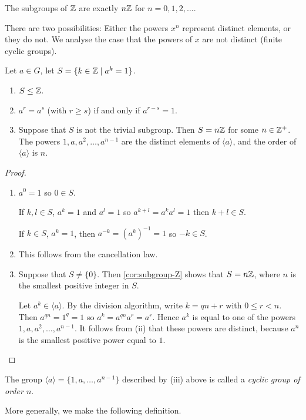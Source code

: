 \begin{corollary}\label{cor:subgroup-Z}
The subgroups of $\mathbb Z$ are exactly $n\mathbb Z$ for $n=0,1,2,\dots$.
\end{corollary}

There are two possibilities: Either the powers $x^n$ represent distinct elements, or they do not. We analyse the case that the powers of $x$ are not distinct (finite cyclic groups).

\begin{proposition}\label{prop:cyclic-group-order}
Let $a\in G$, let $S=\{k\in\mathbb Z\mid a^k=1\}$.
\begin{enumerate}[label=(\roman*)]
\item $S\le\mathbb Z$.
\item $a^r=a^s$ (with $r\ge s$) if and only if $a^{r-s}=1$.
\item Suppose that $S$ is not the trivial subgroup. Then $S=n\mathbb Z$ for some $n\in\mathbb Z^+$. The powers $1,a,a^2,\dots,a^{n-1}$ are the distinct elements of $\langle a\rangle$, and the order of $\langle a\rangle$ is $n$.
\end{enumerate}
\end{proposition}

\begin{proof} \
\begin{enumerate}[label=(\roman*)]
\item $a^0=1$ so $0\in S$.

If $k,l\in S$, $a^k=1$ and $a^l=1$ so $a^{k+l}=a^ka^l=1$ then $k+l\in S$. 

If $k\in S$, $a^k=1$, then $a^{-k}=(a^k)^{-1}=1$ so $-k\in S$.
\item This follows from the cancellation law.
\item Suppose that $S\neq\{0\}$. Then \cref{cor:subgroup-Z} shows that $S=n\mathbb Z$, where $n$ is the smallest positive integer in $S$.

Let $a^k\in\langle a\rangle$. By the division algorithm, write $k=qn+r$ with $0\le r<n$. Then $a^{qn}=1^q=1$ so $a^k=a^{qn}a^r=a^r$. Hence $a^k$ is equal to one of the powers $1,a,a^2,\dots,a^{n-1}$. It follows from (ii) that these powers are distinct, because $a^n$ is the smallest positive power equal to $1$.
\end{enumerate}
\end{proof}

The group $\langle a\rangle=\{1,a,\dots,a^{n-1}\}$ described by (iii) above is called a \emph{cyclic group of order $n$}.

More generally, we make the following definition.

